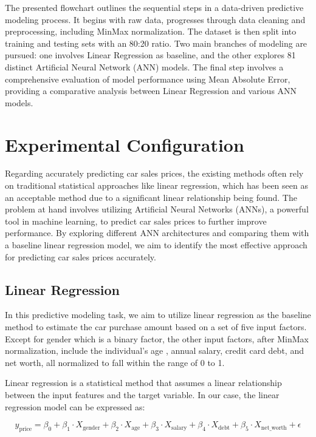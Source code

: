 \documentclass[manuscript,screen,review,nonacm]{acmart}
\begin{document}
The presented flowchart outlines the sequential steps in a data-driven predictive modeling process. It begins with raw data, progresses through data cleaning and preprocessing, including MinMax normalization. The dataset is then split into training and testing sets with an 80:20 ratio. Two main branches of modeling are pursued: one involves Linear Regression as baseline, and the other explores 81 distinct Artificial Neural Network (ANN) models. The final step involves a comprehensive evaluation of model performance using Mean Absolute Error, providing a comparative analysis between Linear Regression and various ANN models.

\section{Experimental Configuration}
Regarding accurately predicting car sales prices, the existing methods often rely on traditional statistical approaches like linear regression, which has been seen as an acceptable method due to a significant linear relationship being found. The problem at hand involves utilizing Artificial Neural Networks (ANNs), a powerful tool in machine learning, to predict car sales prices to further improve performance. By exploring different ANN architectures and comparing them with a baseline linear regression model, we aim to identify the most effective approach for predicting car sales prices accurately.


\subsection{Linear Regression}
In this predictive modeling task, we aim to utilize linear regression as the baseline method to estimate the car purchase amount based on a set of five input factors. Except for gender which is a binary factor, the other input factors, after MinMax normalization, include the individual's age , annual salary, credit card debt, and net worth, all normalized to fall within the range of 0 to 1.


Linear regression is a statistical method that assumes a linear relationship between the input features and the target variable. In our case, the linear regression model can be expressed as:


\begin{equation*}
y_{\text{price}} = \beta_0 + \beta_1 \cdot X_{\text{gender}} + \beta_2 \cdot X_{\text{age}} + \beta_3 \cdot X_{\text{salary}} + \beta_4 \cdot X_{\text{debt}} + \beta_5 \cdot X_{\text{net\_worth}} + \epsilon
\end{equation*}
\end{document}
